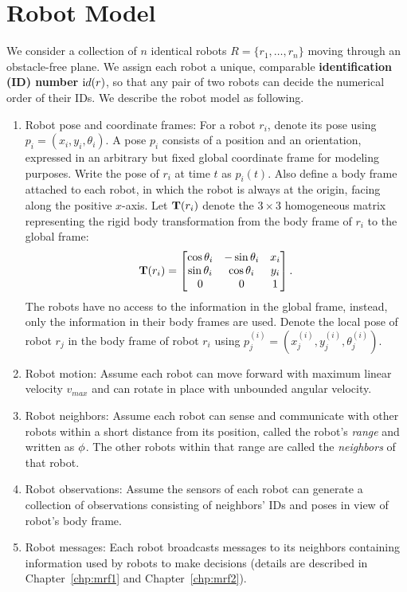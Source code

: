 \section{Robot Model}
\label{sec:robot-model}
We consider a collection of $n$ identical robots $R = \{r_1, \ldots, r_n \}$ moving through an obstacle-free plane. 
%
We assign each robot a unique, comparable \textbf{identification (ID) number} ${\textrm id}(r)$, 
so that any pair of two robots can decide the numerical order of their IDs.
%
We describe the robot model as following.
\begin{enumerate}
\item Robot pose and coordinate frames: For a robot $r_i$, denote its pose using
  $p_i = (x_i, y_i, \theta_i)$. A pose $p_i$ consists of a position and an
  orientation, expressed in an arbitrary but fixed global coordinate frame for
  modeling purposes. Write the pose of $r_i$ at time $t$ as $p_i(t)$.  Also
  define a body frame attached to each robot, in which the robot is always at
  the origin, facing along the positive $x$-axis.  Let $\mathbf{T}(r_i)$ denote the $3
  \times 3$ homogeneous matrix representing the rigid body transformation from
  the body frame of $r_i$ to the global frame:
  \begin{equation}
    \label{eq:trans}
    \mathbf{T}(r_i) =  \begin{bmatrix}
      \cos{\theta_i} & - \sin{\theta_i} & x_i\\
      \sin{\theta_i} & \cos{\theta_i} & y_i \\
      0 & 0 & 1\\
    \end{bmatrix}.
  \end{equation}
  The robots have no access to the information in the global frame,
  instead, only the information in their body frames are used. 
  Denote the local pose of robot $r_j$ in the body frame of robot $r_i$ using
  $p_j^{(i)} = (x_j^{(i)}, y_j^{(i)}, \theta_j^{(i)})$.
\item Robot motion: Assume each robot can move forward with maximum
  linear velocity $v_{max}$ and can rotate in place with unbounded
  angular velocity.
\item Robot neighbors: Assume each robot can sense and
  communicate with other robots within a short distance from its
  position, called the robot's \textit{range} and written as $\phi$.
  The other robots within that range are called the \textit{neighbors}
  of that robot.
\item Robot observations: Assume the sensors of each robot can generate
  a collection of observations consisting of neighbors' IDs and poses
  in view of robot's body frame.
\item Robot messages: Each robot broadcasts messages to its neighbors
  containing information used by robots to make decisions (details are
  described in Chapter~\ref{chp:mrf1} and Chapter~\ref{chp:mrf2}). 
\end{enumerate}

